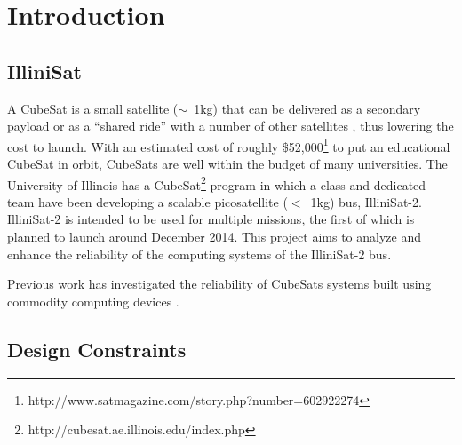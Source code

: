 \section{Introduction}
\subsection{IlliniSat}
A CubeSat is a small satellite ($\sim$~1kg) that can be delivered as a secondary
payload or as a ``shared ride'' with a number of other satellites , thus
lowering the cost to launch\cite{toorian2008cubesat}.  With an estimated cost of
roughly \$52,000\footnote{http://www.satmagazine.com/story.php?number=602922274}
to put an educational CubeSat in orbit, CubeSats are well within the budget of
many universities.  The University of Illinois has a
CubeSat\footnote{http://cubesat.ae.illinois.edu/index.php} program in which a
class and dedicated team have been developing a scalable picosatellite ($<$~1kg)
bus, IlliniSat-2.  IlliniSat-2 is intended to be used for multiple missions, the
first of which is planned to launch around December 2014.  This project aims to
analyze and enhance the reliability of the computing systems of the IlliniSat-2
bus.

Previous work has investigated the reliability of CubeSats systems built using
commodity computing devices \cite{odegaard2013error}.
\subsection{Design Constraints}
